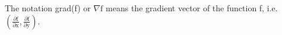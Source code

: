 The notation grad(f) or $ \nabla \mathrm{f} $ means the gradient
vector of the function f, i.e. $ \left ( \frac{\partial \mathrm{f}}
{\partial \mathrm{x}} , \frac{\partial \mathrm{f}} {\partial \mathrm{y}} \right ) . $